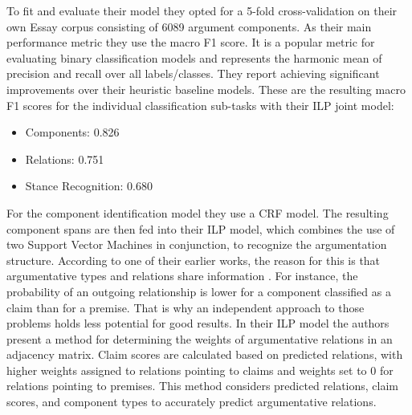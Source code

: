 To fit and evaluate their model they opted for a 5-fold cross-validation on their own Essay corpus consisting of 6089 argument components. As their main performance metric they use the macro F1 score. It is a popular metric for evaluating binary classification models and represents the harmonic mean of precision and recall over all labels/classes. They report achieving significant improvements over their heuristic baseline models. These are the resulting macro F1 scores for the individual classification sub-tasks with their ILP joint model: 
\begin{itemize}
    \item Components: 0.826
    \item Relations: 0.751
    \item Stance Recognition: 0.680 
\end{itemize}
For the component identification model they use a CRF model. The resulting component spans are then fed into their ILP model, which combines the use of two Support Vector Machines in conjunction, to recognize the argumentation structure. According to one of their earlier works, the reason for this is that argumentative types and relations share information \parencite{stab-gurevych-2014-identifying}. For instance, the probability of an outgoing relationship is lower for a component classified as a claim than for a premise. That is why an independent approach to those problems holds less potential for good results. In their ILP model the authors present a method for determining the weights of argumentative relations in an adjacency matrix. Claim scores are calculated based on predicted relations, with higher weights assigned to relations pointing to claims and weights set to 0 for relations pointing to premises. This method considers predicted relations, claim scores, and component types to accurately predict argumentative relations.

